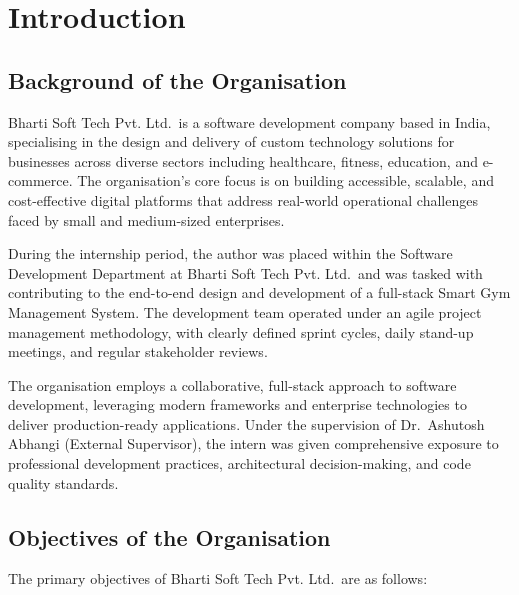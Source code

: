\documentclass[
  12pt,
  a4paperpaper,
]{report}
\begin{document}
\clearpage

\cleardoublepage
{}
\setcounter{page}{1}
\chapter{Introduction}\label{introduction}


\section{Background of the
Organisation}\label{background-of-the-organisation}

Bharti Soft Tech Pvt. Ltd.~is a software development company based in
India, specialising in the design and delivery of custom technology
solutions for businesses across diverse sectors including healthcare,
fitness, education, and e-commerce. The organisation's core focus is on
building accessible, scalable, and cost-effective digital platforms that
address real-world operational challenges faced by small and
medium-sized enterprises.

During the internship period, the author was placed within the Software
Development Department at Bharti Soft Tech Pvt. Ltd.~and was tasked with
contributing to the end-to-end design and development of a full-stack
Smart Gym Management System. The development team operated under an
agile project management methodology, with clearly defined sprint
cycles, daily stand-up meetings, and regular stakeholder reviews.

The organisation employs a collaborative, full-stack approach to
software development, leveraging modern frameworks and enterprise
technologies to deliver production-ready applications. Under the
supervision of Dr.~Ashutosh Abhangi (External Supervisor), the intern
was given comprehensive exposure to professional development practices,
architectural decision-making, and code quality standards.


\section{Objectives of the
Organisation}\label{objectives-of-the-organisation}

The primary objectives of Bharti Soft Tech Pvt. Ltd.~are as follows:
\end{document}
